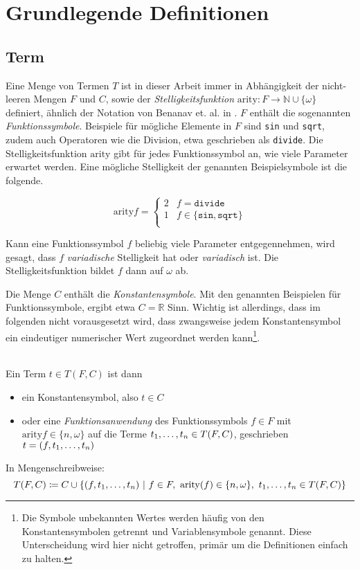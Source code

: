 


\chapter{Grundlegende Definitionen} \label{secGrundlegendeDefinitionen}

\section{Term} \label{subsecTerm}
Eine Menge von Termen $T$ ist in dieser Arbeit immer  in Abhängigkeit der nicht-leeren Mengen $F$ und $C$, sowie der \emph{Stelligkeitsfunktion} $\mathrm{arity} \colon F \rightarrow \mathbb{N} \cup \{\omega\}$ definiert, ähnlich der Notation von Benanav et. al. in \cite{NPHardMatching}. $F$ enthält die sogenannten \emph{Funktionssymbole}. Beispiele für mögliche Elemente in $F$ sind \texttt{sin} und \texttt{sqrt}, zudem auch Operatoren wie die Division, etwa geschrieben als \texttt{divide}. Die Stelligkeitsfunktion $\mathrm{arity}$ gibt für jedes Funktionssymbol an, wie viele Parameter erwartet werden. Eine mögliche Stelligkeit der genannten Beispielsymbole ist die folgende.

$$\mathrm{arity} f = \begin{cases}
2 & f  = \texttt{divide}\\
1 & f \in \{\texttt{sin}, \texttt{sqrt}\}\\
\end{cases}$$

Kann eine Funktionssymbol $f$ beliebig viele Parameter entgegennehmen, wird gesagt, dass $f$ \emph{variadische} Stelligkeit hat oder \emph{variadisch} ist. Die Stelligkeitsfunktion bildet $f$ dann auf $\omega$ ab. 

Die Menge $C$ enthält die \emph{Konstantensymbole}. Mit den genannten Beispielen für Funktionssymbole, ergibt etwa $C = \mathbb R$ Sinn. Wichtig ist allerdings, dass im folgenden nicht vorausgesetzt wird, dass zwangsweise jedem Konstantensymbol ein eindeutiger numerischer Wert zugeordnet werden kann\footnote{Die Symbole unbekannten Wertes werden häufig von den Konstantensymbolen getrennt und Variablensymbole genannt. Diese Unterscheidung wird hier nicht getroffen, primär um die Definitionen einfach zu halten.}.




\begin{definition}\label{defTerm}~\\
Ein Term $t \in T(F, C)$ ist dann  {
\begin{itemize}
	\item{ein Konstantensymbol, also $t \in C$}
	\item{oder eine \emph{Funktionsanwendung} des Funktionssymbols $f \in F$ mit $\mathrm{arity} f \in \{n, \omega\}$ 
		auf die Terme ${\tOneN \in T(F, C)}$, geschrieben ${t = (f, \tOneN)}$}
\end{itemize}}
In Mengenschreibweise:
$$T(F, C) \coloneqq C \cup \curl*{
(f, \tOneN)~|
~f\in F,~\mathrm{arity}(f) \in \{n, \omega\},~ \tOneN \in T(F, C)
}$$ 
\end{definition}

